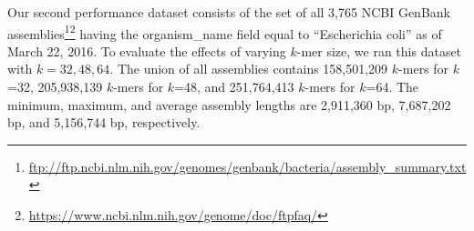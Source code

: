 
Our second performance dataset consists of the set of all 3,765  NCBI GenBank assemblies\footnote{\url{ftp://ftp.ncbi.nlm.nih.gov/genomes/genbank/bacteria/assembly_summary.txt}}\footnote{\url{https://www.ncbi.nlm.nih.gov/genome/doc/ftpfaq/}} having the organism\_name field equal to ``Escherichia coli'' as of March 22, 2016.  To evaluate the effects of varying $k$-mer size, we ran this dataset with $k={32,48,64}$.  The union of all assemblies contains 158,501,209 $k$-mers for $k$=32, 205,938,139 $k$-mers for $k$=48, and 251,764,413 $k$-mers for $k$=64.  The minimum, maximum, and average assembly lengths are 2,911,360 bp, 7,687,202 bp, and 5,156,744 bp, respectively.




